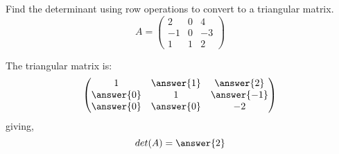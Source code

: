 \documentclass{ximera}
\author{Parisa Fatheddin}
\begin{document}
\begin{exercise}


Find the determinant using row operations to convert to a triangular matrix.
\[
A = \begin{pmatrix}
2 & 0 & 4\\
-1 & 0 & -3\\
1 & 1 & 2
\end{pmatrix}
\]

\begin{prompt}
The triangular matrix is:
\[\begin{pmatrix}
1 & \answer{1} & \answer{2}\\
\answer{0} & 1 & \answer{-1}\\
\answer{0} & \answer{0} & -2
\end{pmatrix}\]
giving,
\[det(A) = \answer{2}\]
\end{prompt}


































\end{exercise}
\end{document}
